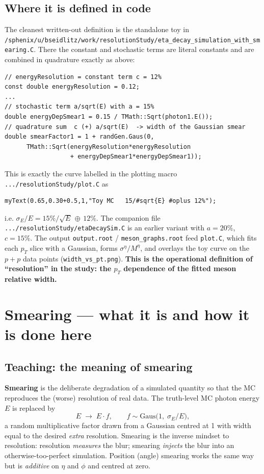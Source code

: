 \documentclass[11pt]{article}
\newcommand{\pp}[1]{\textcolor{pathcol}{\texttt{#1}}}
\begin{document}
\subsection{Where it is defined in code}
The cleanest written-out definition is the standalone toy in\\
\pp{/sphenix/u/bseidlitz/work/resolutionStudy/eta\_decay\_simulation\_with\_smearing.C}.
There the constant and stochastic terms are literal constants and are combined
in quadrature exactly as above:

\begin{lstlisting}
// energyResolution = constant term c = 12%
const double energyResolution = 0.12;
...
// stochastic term a/sqrt(E) with a = 15%
double energyDepSmear1 = 0.15 / TMath::Sqrt(photon1.E());
// quadrature sum  c (+) a/sqrt(E)  -> width of the Gaussian smear
double smearFactor1 = 1 + randGen.Gaus(0,
      TMath::Sqrt(energyResolution*energyResolution
                  + energyDepSmear1*energyDepSmear1));
\end{lstlisting}

This is exactly the curve labelled in the plotting macro
\pp{.../resolutionStudy/plot.C} as

\begin{lstlisting}
myText(0.65,0.30+0.5,1,"Toy MC   15/#sqrt{E} #oplus 12%");
\end{lstlisting}

i.e. $\sigma_E/E = 15\%/\sqrt{E}\,\oplus\,12\%$. The companion file
\pp{.../resolutionStudy/etaDecaySim.C} is an earlier variant with
$a=20\%$, $c=15\%$. The output \texttt{output.root} /
\texttt{meson\_graphs.root} feed \texttt{plot.C}, which fits each $p_T$ slice
with a Gaussian, forms $\sigma^{\eta}/M^{\eta}$, and overlays the toy curve on
the $p{+}p$ data points (\texttt{width\_vs\_pt.png}). \textbf{This is the
operational definition of ``resolution'' in the study: the $p_T$ dependence of
the fitted meson relative width.}

\section{Smearing --- what it is and how it is done here}

\subsection{Teaching: the meaning of smearing}
\textbf{Smearing} is the deliberate degradation of a simulated quantity so that
the MC reproduces the (worse) resolution of real data. The truth-level MC
photon energy $E$ is replaced by
\[
  E \;\longrightarrow\; E\cdot f,\qquad
  f \sim \mathrm{Gaus}\!\big(1,\;\sigma_E/E\big),
\]
a random multiplicative factor drawn from a Gaussian centred at 1 with width
equal to the desired \emph{extra} resolution. Smearing is the inverse mindset
to resolution: resolution \emph{measures} the blur; smearing \emph{injects} the
blur into an otherwise-too-perfect simulation. Position (angle) smearing works
the same way but is \emph{additive} on $\eta$ and $\phi$ and centred at zero.
\end{document}
